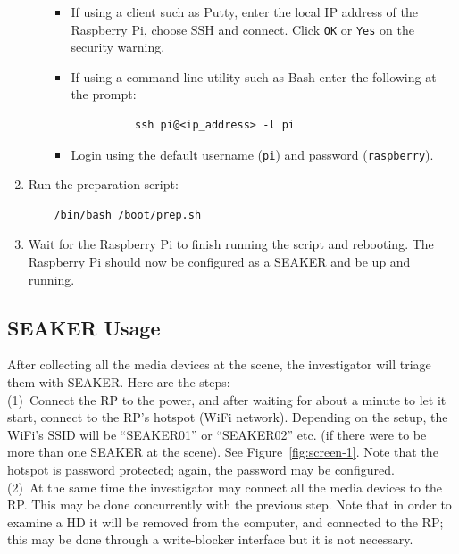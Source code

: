 \documentclass[12pt]{article}
\begin{document}
\begin{enumerate}
\begin{itemize}
      \begin{itemize}
        \item If using a client such as Putty, enter the local IP address
        of the Raspberry Pi, choose SSH and connect. Click \verb|OK| or
        \verb|Yes| on the security warning.
        \item If using a command line utility such as Bash enter the
        following at the prompt:
        \begin{verbatim}
          ssh pi@<ip_address> -l pi
        \end{verbatim}
        \item Login using the default username (\verb|pi|) and password
        (\verb|raspberry|).
      \end{itemize}
    \end{itemize}
  \item Run the preparation script:
  \begin{verbatim}
    /bin/bash /boot/prep.sh
  \end{verbatim}
  \item Wait for the Raspberry Pi to finish running the script and
  rebooting. The Raspberry Pi should now be configured as a SEAKER
  and be up and running.
\end{enumerate}

\newpage
\subsection{SEAKER Usage}
After collecting all the media devices at the scene, the investigator
will triage them with SEAKER. Here are the steps:\\

(1)~Connect the RP to the power, and after waiting for about a minute
to let it start, connect to the RP's hotspot (WiFi network). Depending
on the setup, the WiFi's SSID will be ``SEAKER01'' or ``SEAKER02''
etc. (if there were to be more than one SEAKER at the scene). See
Figure~\ref{fig:screen-1}. Note that the hotspot is password
protected; again, the password may be configured.\\

(2)~At the same time the investigator may connect all the media
devices to the RP. This may be done concurrently with the previous
step. Note that in order to examine a HD it will be removed from the
computer, and connected to the RP; this may be done through a
write-blocker interface but it is not necessary.\\
\end{document}
